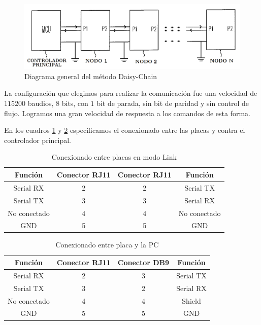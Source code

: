 \begin{figure}[h]
	\centering
	\includegraphics[scale=.40]{figuras/daisychain_diagram.png}
	\caption{Diagrama general del m\'etodo Daisy-Chain}
	\label{hF_comm_daisychain}
\end{figure}

La configuraci\'on que elegimos para realizar la comunicaci\'on fue una velocidad de $115200$ baudios, $8$ bits, con $1$
bit de parada, sin bit de paridad y sin control de flujo.
Logramos una gran velocidad de respuesta a los comandos de esta forma.

En los cuadros \ref{hT_comm_conexionLink} y \ref{hT_comm_conexionRS232} especificamos el conexionado entre las placas
y contra el controlador principal.

\begin{table}[h]
	\begin{center}
		\begin{tabular}{|c|c|c|c|}
			\hline
			Funci\'on & Conector RJ11 & Conector RJ11 & Funci\'on\\
			\hline
			Serial RX & 2 & 2 & Serial TX \\
			\hline
			Serial TX & 3 & 3 & Serial RX \\
			\hline
			No conectado & 4 & 4 & No conectado \\
			\hline
			GND & 5 & 5 &  GND\\
			\hline
		\end{tabular}
		\caption{Conexionado entre placas en modo Link}
		\label{hT_comm_conexionLink}
	\end{center}
\end{table}

\begin{table}[h]
	\begin{center}
		\begin{tabular}{|c|c|c|c|}
			\hline
			Funci\'on & Conector RJ11 & Conector DB9 & Funci\'on\\
			\hline
			Serial RX & 2 & 3 & Serial TX \\
			\hline
			Serial TX & 3 & 2 & Serial RX \\
			\hline
			No conectado & 4 & 4 & Shield \\
			\hline
			GND & 5 & 5 &  GND\\
			\hline
		\end{tabular}
		\caption{Conexionado entre placa y la PC}
		\label{hT_comm_conexionRS232}
	\end{center}
\end{table}

